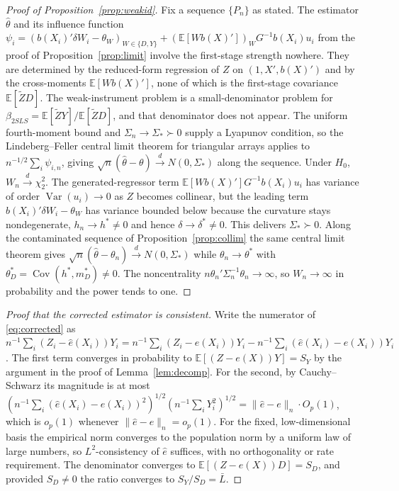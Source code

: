 \documentclass[11pt]{article}
\theoremstyle{plain}
\theoremstyle{definition}
\newcommand{\E}{\mathbb{E}}
\newcommand{\Cov}{\operatorname{Cov}}
\newcommand{\Var}{\operatorname{Var}}
\newcommand{\Lb}{\bar{L}}
\newcommand{\Zt}{\tilde{Z}}
\begin{document}
\begin{proof}[Proof of Proposition~\ref{prop:weakid}]
Fix a sequence $\{P_n\}$ as stated. The estimator $\hat\theta$ and its influence function $\psi_i=(b(X_i)'\delta W_i-\theta_W)_{W\in\{D,Y\}}+(\E[Wb(X)'])_W G^{-1}b(X_i)u_i$ from the proof of Proposition~\ref{prop:limit} involve the first-stage strength nowhere. They are determined by the reduced-form regression of $Z$ on $(1,X',b(X)')$ and by the cross-moments $\E[Wb(X)']$, none of which is the first-stage covariance $\E[\Zt D]$. The weak-instrument problem is a small-denominator problem for $\beta_{2SLS}=\E[\Zt Y]/\E[\Zt D]$, and that denominator does not appear. The uniform fourth-moment bound and $\Sigma_n\to\Sigma_\ast\succ 0$ supply a Lyapunov condition, so the Lindeberg--Feller central limit theorem for triangular arrays applies to $n^{-1/2}\sum_i\psi_{i,n}$, giving $\sqrt{n}(\hat\theta-\theta)\xrightarrow{d}N(0,\Sigma_\ast)$ along the sequence. Under $H_0$, $W_n\xrightarrow{d}\chi^2_2$. The generated-regressor term $\E[Wb(X)']G^{-1}b(X_i)u_i$ has variance of order $\Var(u_i)\to 0$ as $Z$ becomes collinear, but the leading term $b(X_i)'\delta W_i-\theta_W$ has variance bounded below because the curvature stays nondegenerate, $h_n\to h^\ast\neq 0$ and hence $\delta\to\delta^\ast\neq 0$. This delivers $\Sigma_\ast\succ 0$. Along the contaminated sequence of Proposition~\ref{prop:collim} the same central limit theorem gives $\sqrt{n}(\hat\theta-\theta_n)\xrightarrow{d}N(0,\Sigma_\ast)$ while $\theta_n\to\theta^\ast$ with $\theta_D^\ast=\Cov(h^\ast,m_D^\ast)\neq 0$. The noncentrality $n\theta_n'\Sigma_n^{-1}\theta_n\to\infty$, so $W_n\to\infty$ in probability and the power tends to one.
\end{proof}

\begin{proof}[Proof that the corrected estimator is consistent]
Write the numerator of \eqref{eq:corrected} as $n^{-1}\sum_i(Z_i-\hat e(X_i))Y_i=n^{-1}\sum_i(Z_i-e(X_i))Y_i-n^{-1}\sum_i(\hat e(X_i)-e(X_i))Y_i$. The first term converges in probability to $\E[(Z-e(X))Y]=S_Y$ by the argument in the proof of Lemma~\ref{lem:decomp}. For the second, by Cauchy--Schwarz its magnitude is at most $(n^{-1}\sum_i(\hat e(X_i)-e(X_i))^2)^{1/2}(n^{-1}\sum_i Y_i^2)^{1/2}=\|\hat e-e\|_n\cdot O_p(1)$, which is $o_p(1)$ whenever $\|\hat e-e\|_n=o_p(1)$. For the fixed, low-dimensional basis the empirical norm converges to the population norm by a uniform law of large numbers, so $L^2$-consistency of $\hat e$ suffices, with no orthogonality or rate requirement. The denominator converges to $\E[(Z-e(X))D]=S_D$, and provided $S_D\neq 0$ the ratio converges to $S_Y/S_D=\Lb$.
\end{proof}
\end{document}

